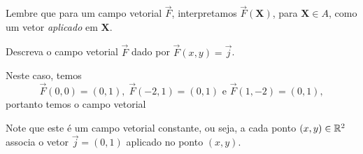 Lembre que para um campo vetorial \(\overrightarrow{F}\), interpretamos \(\overrightarrow{F}(\mathbf{X})\), para \(\mathbf{X}\in A\), como um vetor \textit{aplicado} em \(\mathbf{X}\).

\begin{example}
    Descreva o campo vetorial \(\overrightarrow{F}\) dado por \(\overrightarrow{F}(x,y) = \overrightarrow{j}\).

    Neste caso, temos \[\overrightarrow{F}(0,0) = (0,1),\; \overrightarrow{F}(-2,1) = (0,1) \text{ e } \overrightarrow{F}(1,-2)=(0,1),\] portanto temos o campo vetorial
    
    Note que este é um campo vetorial constante, ou seja, a cada ponto \((x,y)\in\mathbb{R}^2\) associa o vetor \(\overrightarrow{j} = (0,1)\) aplicado no ponto \((x,y)\).
\end{example}


